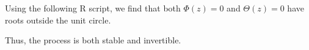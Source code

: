 \begin{enumerate}
\begin{sol}
              Using the following R script, we find that both $\Phi(z) = 0$ and $\Theta(z) = 0$ have roots outside the unit circle.
              
              Thus, the process is both stable and invertible.
          \end{sol}
\end{enumerate}